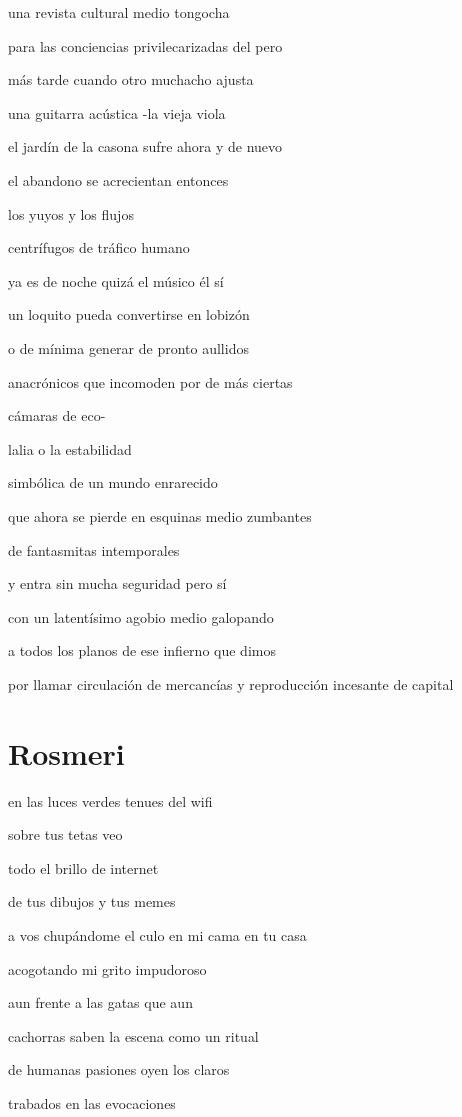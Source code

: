 \documentclass[
]{book}
\begin{document}
una revista cultural medio tongocha

para las conciencias privilecarizadas del pero

más tarde cuando otro muchacho ajusta

una guitarra acústica -la vieja viola

el jardín de la casona sufre ahora y de nuevo

el abandono se acrecientan entonces

los yuyos y los flujos

centrífugos de tráfico humano

ya es de noche quizá el músico él sí

un loquito pueda convertirse en lobizón

o de mínima generar de pronto aullidos

anacrónicos que incomoden por de más ciertas

cámaras de eco-

lalia o la estabilidad

simbólica de un mundo enrarecido

que ahora se pierde en esquinas medio zumbantes

de fantasmitas intemporales

y entra sin mucha seguridad pero sí

con un latentísimo agobio medio galopando

a todos los planos de ese infierno que dimos

por llamar circulación de mercancías y reproducción incesante de capital

\hypertarget{rosmeri}{%
\chapter{Rosmeri}\label{rosmeri}}

en las luces verdes tenues del wifi

sobre tus tetas veo

todo el brillo de internet

de tus dibujos y tus memes

a vos chupándome el culo en mi cama en tu casa

acogotando mi grito impudoroso

aun frente a las gatas que aun

cachorras saben la escena como un ritual

de humanas pasiones oyen los claros

trabados en las evocaciones
\end{document}
